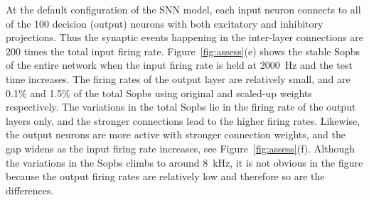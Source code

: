 At the default configuration of the SNN model, each input neuron connects to all of the 100 decision (output) neurons with both excitatory and inhibitory projections.
Thus the synaptic events happening in the inter-layer connections are 200 times the total input firing rate.
Figure~\ref{fig:assess}(e) shows the stable Sopbs of the entire network when the input firing rate is held at 2000~Hz and the test time increases.
The firing rates of the output layer are relatively small, and are 0.1\% and 1.5\% of the total Sopbs using original and scaled-up weights respectively.
The variations in the total Sopbs lie in the firing rate of the output layers only, and the stronger connections lead to the higher firing rates.
Likewise, the output neurons are more active with stronger connection weights, and the gap widens as the input firing rate increases, see Figure~\ref{fig:assess}(f).
Although the variations in the Sopbs climbs to around 8~kHz, it is not obvious in the figure because the output firing rates are relatively low and therefore so are the differences.
